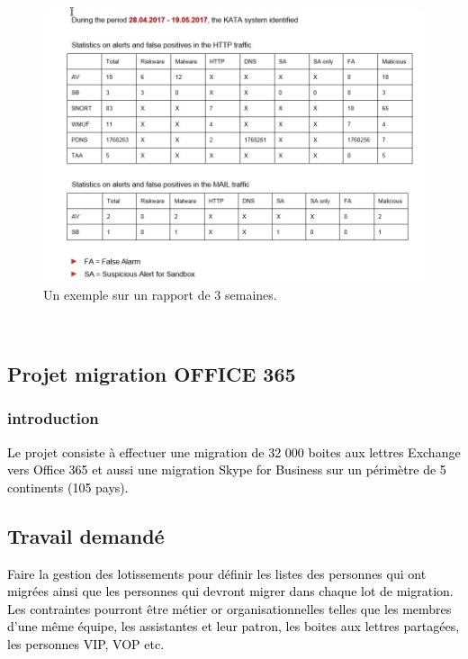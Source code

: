\documentclass[a4paper,12pt]{report}
\begin{document}
		 		 
\begin{figure}[H]
	\begin{center}
		\includegraphics[width=1\linewidth]{Projet_KATA/rapport_ksy}
\end{center}
	\caption{Un exemple sur un rapport de 3 semaines.}
	\label{fig:12}	
\end{figure}	
~~\\

\subsection{Projet migration OFFICE 365}
\subsubsection*{introduction}

\textcolor{black}{Le projet consiste à effectuer une migration de 32 000 boites aux lettres Exchange vers Office 365 et aussi une migration Skype for Business sur un périmètre de 5 continents (105 pays).}

\subsection*{Travail demandé	}


\textcolor{black}{Faire la gestion des lotissements pour définir les listes des personnes qui ont migrées ainsi que les personnes qui devront migrer dans chaque lot de migration.
Les contraintes pourront être métier or organisationnelles telles que les membres d’une même équipe, les assistantes et leur patron, les boites aux lettres partagées, les personnes VIP, VOP etc.}
\end{document}
